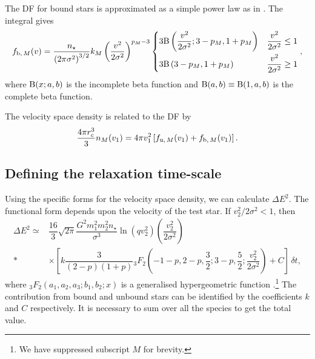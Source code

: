 The DF for bound stars is approximated as a simple power law as in . The integral gives
\begin{equation}
f_{\mathrm{b},\,M}(v) = \dfrac{n_\star}{\left(2\pi\sigma^2\right)^{3/2}}k_M \left(\dfrac{v^2}{2\sigma^2}\right)^{p_M - 3}\begin{cases}
3 \Beta\left(\dfrac{v^2}{2\sigma^2}; 3 - p_M, 1 + p_M\right) \vspace{1mm} & \dfrac{v^2}{2\sigma^2} \leq 1 \\
3 \Beta\left(3 - p_M, 1 + p_M\right) & \dfrac{v^2}{2\sigma^2} \geq 1
\end{cases},
\end{equation}
where $\mathrm{B}(x;a,b)$ is the incomplete beta function \citep[section 8.17]{Olver2010} and $\mathrm{B}(a,b) \equiv \mathrm{B}(1,a,b)$ is the complete beta function.

The velocity space density is related to the DF by
\begin{equation}
\dfrac{4\pi r_\mathrm{c}^3}{3}n_M(v_1) = 4\pi v_1^2\left[f_{\mathrm{u},\,M}(v_1) + f_{\mathrm{b},\,M}(v_1)\right].
\end{equation}

\subsection{Defining the relaxation time-scale}

Using the specific forms for the velocity space density, we can calculate $\Delta E^2$. The functional form depends upon the velocity of the test star. If $v_2^2/2\sigma^2 < 1$, then
\begin{align}
\Delta E^2 \simeq {} & \dfrac{16}{3}\sqrt{2\pi}\dfrac{G^2m_1^2 m_2^2n_\star}{\sigma^3}\ln\left(qv_2^2\right) \left(\dfrac{v_2^2}{2\sigma^2}\right) \nonumber \\*
{} & \times \left. \left[k \dfrac{3}{(2 - p)(1 + p)}{_3F_2}\left(-1-p,2-p,\dfrac{3}{2};3-p,\dfrac{5}{2};\dfrac{v_2^2}{2\sigma^2}\right) + C\right]\,\delta t, \right.
\label{eq:w-less-1}
\end{align}
where ${_3F_2}(a_1,a_2,a_3;b_1,b_2;x)$ is a generalised hypergeometric function \citep[section 16]{Olver2010}.\footnote{We have suppressed subscript $M$ for brevity.} The contribution from bound and unbound stars can be identified by the coefficients $k$ and $C$ respectively. It is necessary to sum over all the species to get the total value.

